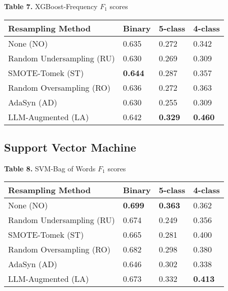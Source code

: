 \documentclass[runningheads]{llncs}
\newenvironment{nscenter}
 {\parskip=0pt\par\nopagebreak\centering}
 {\par\noindent\ignorespacesafterend}
\begin{document}
\begin{nscenter}
{\bf Table 7.} XGBoost-Frequency $F_1$ scores\\

\begin{tabular}{|l|l|l|l|}
\hline
Resampling Method & Binary & 5-class & 4-class \\\hline
None (NO) & 0.635 & 0.272 & 0.342 \\\hline
Random Undersampling (RU) & 0.630 & 0.269 & 0.309 \\\hline
SMOTE-Tomek (ST) & {\bf 0.644} & 0.287 & 0.357 \\\hline
Random Oversampling (RO) & 0.636 & 0.272 & 0.363 \\\hline
AdaSyn (AD) & 0.630 & 0.255 & 0.309 \\\hline
LLM-Augmented (LA) & 0.642 & {\bf 0.329} & {\bf 0.460} \\\hline
\end{tabular}
\end{nscenter}

\subsection{Support Vector Machine}

\begin{nscenter}
{\bf Table 8.} SVM-Bag of Words $F_1$ scores\\

\begin{tabular}{|l|l|l|l|}
\hline
Resampling Method & Binary & 5-class & 4-class \\\hline
None (NO) & {\bf 0.699} & {\bf 0.363} & 0.362 \\\hline
Random Undersampling (RU) & 0.674 & 0.249 & 0.356 \\\hline
SMOTE-Tomek (ST) & 0.665 & 0.281 & 0.400 \\\hline
Random Oversampling (RO) & 0.682 & 0.298 & 0.380 \\\hline
AdaSyn (AD) & 0.646 & 0.302 & 0.338 \\\hline
LLM-Augmented (LA) & 0.673 & 0.332 & {\bf 0.413} \\\hline
\end{tabular}
\end{nscenter}
\end{document}
